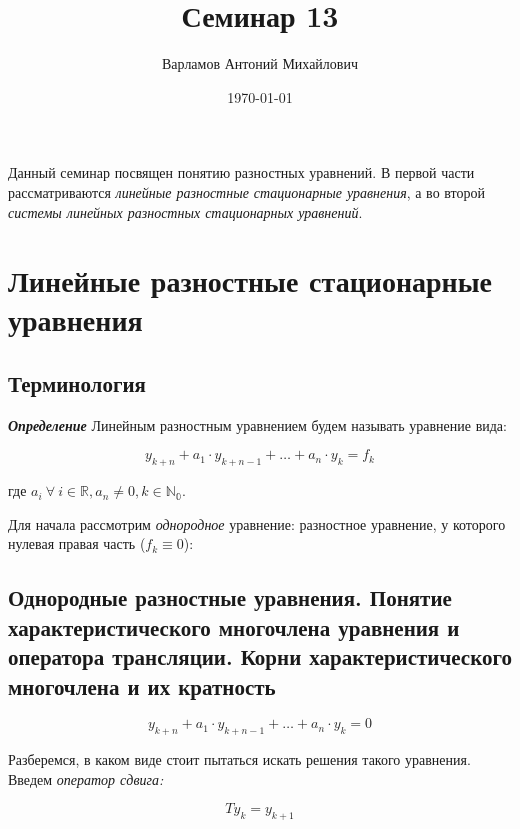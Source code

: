 \documentclass[10pt,a4paper]{article}
\title{Семинар 13}
\date{\today}
\author{Варламов Антоний Михайлович}
\begin{document}
	\maketitle
	
	\tableofcontents
	
	\vspace{1cm}
	
	Данный семинар посвящен понятию разностных уравнений. В первой части
	рассматриваются \textit{линейные разностные стационарные уравнения}, а во 
	второй \textit{системы линейных разностных стационарных уравнений}.	
	
	\section{Линейные разностные стационарные уравнения}
	
	\subsection{Терминология}
	
	\textit{\textbf{Определение}} Линейным разностным уравнением будем называть
	уравнение вида:
	
	\begin{equation}
		y_{k + n} + a_{1}\cdot y_{k + n - 1} + \ldots + a_{n}\cdot y_{k} = f_{k}
	\end{equation}
	
	где $a_{i} \ \forall \ i \in \mathbb{R}, a_{n}\neq 0, k \in \mathbb{N_{0}}$.
	
	Для начала рассмотрим \textit{однородное} уравнение: разностное уравнение, у 
	которого нулевая правая часть ($f_{k} \equiv 0$):
	
	\subsection{Однородные разностные уравнения. Понятие характеристического 
	многочлена уравнения и оператора трансляции. Корни характеристического 
	многочлена и их кратность}
	
	\begin{equation}
		y_{k + n} + a_{1}\cdot y_{k + n - 1} + \ldots + a_{n}\cdot y_{k} = 0
	\end{equation}
	
	Разберемся, в каком виде стоит пытаться искать решения такого уравнения. 
	Введем \textit{оператор сдвига:}
	
	\begin{equation}
		T y_{k} = y_{k + 1}
	\end{equation}
	
\end{document}
